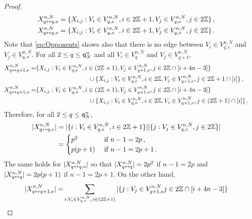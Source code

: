 \begin{proof}
\begin{align*}
\notag X_{q \link q,e}^{n,N}&=\{X_{i,j} : V_i\in V_{q,e}^{n,N},i\in 2\bZ+1, V_j\in V_{q,e}^{n,N},j\in 2\bZ\}\eqsp,\\
X_{q\link q,o}^{n,N}&=\{X_{i,j} : V_i\in V_{q,o}^{n,N},i\in 2\bZ+1, V_j\in V_{q,o}^{n,N},j\in 2\bZ\}\eqsp.%
\end{align*}
Note that \eqref{eq:Opponents} shows also that there is no edge between $V_i\in V_{q,e}^{n,N}$ and $V_j\in V_{q,o}^{n,N}$. For all $2\le q\le {\mathsf{q}}^{n}_{N}$ and all $V_i\in V_{q}^{n,N}$ and $V_j\in V_{q+1}^{n,N}$, 
\begin{align*}
X_{q\link q+1,e}^{n,N}=&\{X_{i,j} : V_i\in V_{q,e}^{n,N},i\in(2\bZ+1),V_j\in V_{q+1,e}^{n,N},j\in 2\bZ\cap [i+4n-3]\}\\
&\hspace{3cm}\cup\{X_{i,j} : V_i\in V_{q,e}^{n,N},i\in 2\bZ,V_j\in V_{q+1,e}^{n,N},j\in 2\bZ+1\cap [i]\}\eqsp,\\
X_{q\link q+1,o}^{n,N}=&\{X_{i,j} : V_i\in V_{q,o}^{n,N},i\in(2\bZ+1),V_j\in V_{q+1,o}^{n,N},j\in2\bZ\cap [i+4n-3]\}\\
&\hspace{3cm}\cup\{X_{i,j} : V_i\in V_{q,o}^{n,N},i\in2\bZ,V_j\in V_{q+1,o}^{n,N},j\in( 2\bZ+1)\cap [i]\}\eqsp.
\end{align*}
Therefore, for all $2\le q\le {\mathsf{q}}^{n}_{N}$,
\begin{align*}
|X_{q\leftrightarrow q,e}^{n,N}|&=|\{i : V_i\in V_{q,e}^{n,N},i\in 2\mathbb{Z}+1\}||\{j: V_j\in V_{q,e}^{n,N},j\in 2\mathbb{Z}\}|\\
&=
\begin{cases}
 p^2&\text{ if }n-1=2p\,,\\
 p(p+1)&\text{ if }n-1=2p+1\,.
\end{cases}
\end{align*}
The same holds for $|X_{q\leftrightarrow q,o}^{n,N}|$ so that $|X_{q\leftrightarrow q}^{n,N}| = 2p^2$ if $n-1=2p$ and $|X_{q\leftrightarrow q}^{n,N}| = 2p(p+1)$ if $n-1=2p+1$. On the other hand,
\begin{align*}
|X_{q\link q+1,e}^{n,N}|=&\sum_{i : V_i\in V_{q,e}^{n,N},\,i\in(2\bZ+1)}|\{j : V_j\in V_{q+1,e}^{n,N}j\in 2\bZ\cap [i+4n-3]\}\\

\end{align*}
\end{proof}
